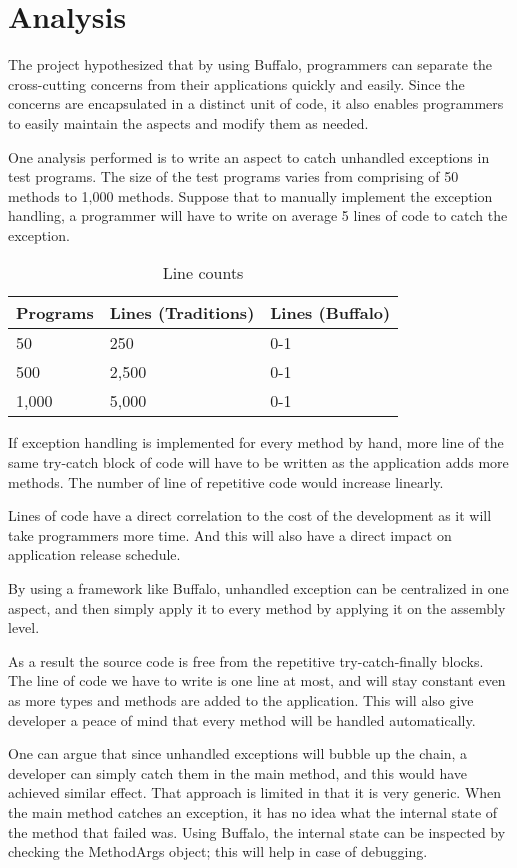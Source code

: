 \chapter{Analysis}

The project hypothesized that by using Buffalo, programmers can separate the cross-cutting concerns from their applications quickly and easily. Since the concerns are encapsulated in a distinct unit of code, it also enables programmers to easily maintain the aspects and modify them as needed.

One analysis performed is to write an aspect to catch unhandled exceptions in test programs. The size of the test programs varies from comprising of 50 methods to 1,000 methods. Suppose that to manually implement the exception handling, a programmer will have to write on average 5 lines of code to catch the exception.

\begin{table}[H]
\centering
\begin{tabular}{|l|l|l|}
\hline
Programs & Lines (Traditions) & Lines (Buffalo)\\
\hline
50 & 250 & 0-1\\
500 & 2,500 & 0-1\\
1,000 & 5,000 & 0-1\\
\hline
\end{tabular}
\caption{Line counts}
\label{tab:lines_tbl}
\end{table}

If exception handling is implemented for every method by hand, more line of the same try-catch block of code will have to be written as the application adds more methods. The number of line of repetitive code would increase linearly.

Lines of code have a direct correlation to the cost of the development as it will take programmers more time. And this will also have a direct impact on application release schedule.

By using a framework like Buffalo, unhandled exception can be centralized in one aspect, and then simply apply it to every method by applying it on the assembly level. 

As a result the source code is free from the repetitive try-catch-finally blocks. The line of code we have to write is one line at most, and will stay constant even as more types and methods are added to the application. This will also give developer a peace of mind that every method will be handled automatically.

One can argue that since unhandled exceptions will bubble up the chain, a developer can simply catch them in the main method, and this would have achieved similar effect. That approach is limited in that it is very generic. When the main method catches an exception, it has no idea what the internal state of the method that failed was. Using Buffalo, the internal state can be inspected by checking the MethodArgs object; this will help in case of debugging. 

